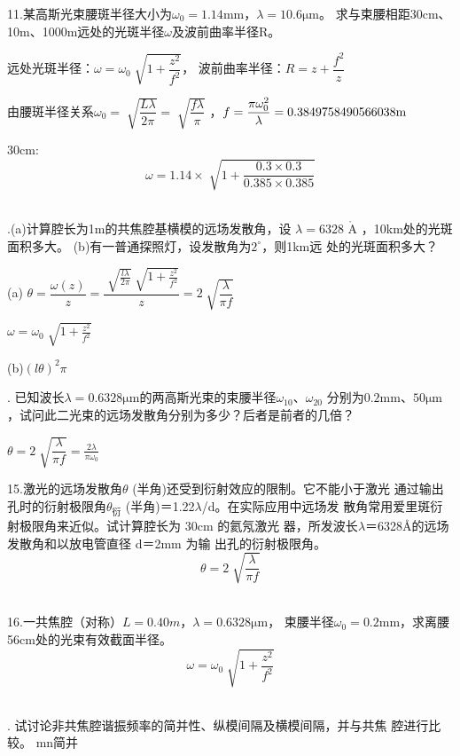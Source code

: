 \documentclass[12pt]{article}
\begin{document}
{\fangsong
11.某高斯光束腰斑半径大小为$\omega_0=1.14\si{\mm}$，$\lambda=10.6\si{\um}$。
求与束腰相距30cm、10m、1000m远处的光斑半径$\omega$及波前曲率半径R。
}
{\kaishu\noindent
\par 远处光斑半径：$\omega=\omega_0 \sqrt[]{1+\dfrac{z^2}{f^2} }$，
波前曲率半径：$R=z+\dfrac{f^2}{z} $
\par 由腰斑半径关系$\omega_0=\sqrt[]{\dfrac{L\lambda}{2\pi} }=\sqrt[]{\dfrac{f\lambda}{\pi} }$ ，$f=\dfrac{\pi\omega_0^2}{\lambda}=\fpeval{3.14*1.14*1.14/10.6}\si{m} $
\par 30cm: 
\[
	\omega=1.14\times \sqrt[]{1+\frac{0.3\times0.3}{0.385\times0.385} }	
\]
\\}

{.(a)计算腔长为1m的共焦腔基横模的远场发散角，设
$\lambda=6328$ $\mathring{\mathrm{A}}$
，10km处的光斑面积多大。
(b)有一普通探照灯，设发散角为$2^\circ$，则1km远
处的光斑面积多大？
}
{\kaishu\noindent
	\par (a) $\theta=\dfrac{\omega(z)}{z} 
	=\dfrac{\sqrt[]{\frac{l\lambda}{2\pi} }\sqrt[]{1+\frac{z^2}{f^2} }}{z} 
	=2 \sqrt[]{\dfrac{\lambda}{\pi f} }$
	\par $\omega=\omega_0 \sqrt[]{1+\frac{z^2}{f^2} }$
	\par (b)$(l\theta)^2\pi$
\\}

{. 已知波长$\lambda=0.6328\si{\um}$的两高斯光束的束腰半径$\omega_{10}$、$\omega_{20}$
	分别为$0.2\si{\mm}$、$50\si{\um}$，试问此二光束的远场发散角分别为多少？后者是前者的几倍？
}
{\kaishu\noindent
\par $\theta=2 \sqrt[]{\dfrac{\lambda}{\pi f} }=\frac{2\lambda}{\pi\omega_0} $
\\}

{\fangsong
15.激光的远场发散角$\theta$ (半角)还受到衍射效应的限制。它不能小于激光
通过输出孔时的衍射极限角$ \theta_{\text{衍}}$ (半角)＝1.22$\lambda$/d。在实际应用中远场发
散角常用爱里斑衍射极限角来近似。试计算腔长为 30cm 的氦氖激光
器，所发波长$\lambda$＝6328Å的远场发散角和以放电管直径 d＝2mm 为输
出孔的衍射极限角。
}
{\kaishu\noindent
	$$\theta=2 \sqrt[]{\dfrac{\lambda}{\pi f} }$$
\\}

{\fangsong
	16.一共焦腔（对称）$L=0.40\si{m}$，$\lambda=0.6328\si{\um}$，
	束腰半径$\omega_0=0.2\si{\mm}$，求离腰56cm处的光束有效截面半径。
}
{\kaishu\noindent
	\[
		\omega=\omega_0 \sqrt[]{1+\dfrac{z^2}{f^2} }
	\]
\\}

{. 试讨论非共焦腔谐振频率的简并性、纵模间隔及横模间隔，并与共焦
腔进行比较。
}
{\kaishu\noindent
	mn简并
\\}
\end{document}
